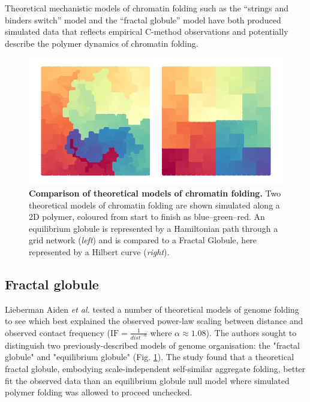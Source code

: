 \documentclass[a4paper,11pt,oneside]{book}
\begin{document}
Theoretical mechanistic models of chromatin folding such as the
``strings and binders switch'' model\cite{Barbieri2012} and the ``fractal
globule'' model\cite{Lieberman2009, Mirny2011, Grosberg1988a} have both produced simulated data
that reflects empirical C-method observations and potentially describe the polymer
dynamics of chromatin folding.

\begin{figure}
\begin{center}
\includegraphics[width=5.5in]{figs/fractals.pdf}
\captionsetup{width=\textwidth}
\caption[ Comparison of theoretical models of chromatin folding. ]{ {\bf Comparison of theoretical models of chromatin folding. } 
 Two theoretical models of chromatin folding are shown simulated along a 2D polymer, coloured from start to finish as blue--green--red. An equilibrium globule is represented by a Hamiltonian path through a grid network (\emph{left}) and is compared to a Fractal Globule, here represented by a Hilbert curve (\emph{right}).
}\label{fig:fractals}
\end{center}
\end{figure} 

\subsection{Fractal globule}
Lieberman Aiden \emph{ et al.}\cite{Lieberman2009} tested a number of theoretical models of genome folding to see which best explained the observed power-law scaling between distance and observed contact frequency ($\textrm{IF} =  \frac{1}{dist^{-\alpha}}$ where $\alpha \approx 1.08$).  The authors sought to distinguish two previously-described models of genome organisation: the "fractal globule" and "equilibrium globule" (Fig. \ref{fig:fractals}). The study found that a theoretical fractal globule, embodying scale-independent self-similar aggregate folding, better fit the observed data than an equilibrium globule null model where simulated polymer folding was allowed to proceed unchecked.
\end{document}
